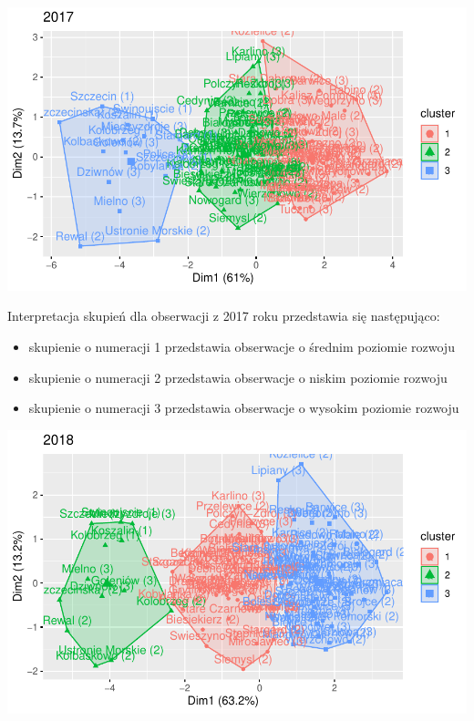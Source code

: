 \documentclass{amuthesis}
\begin{document}
\begin{center}\includegraphics[width=1.05\linewidth]{figures/unnamed-chunk-12-1} \end{center}

Interpretacja skupień dla obserwacji z 2017 roku przedstawia się następująco:

\begin{itemize}
\tightlist
\item
  skupienie o numeracji 1 przedstawia obserwacje o średnim poziomie rozwoju
\item
  skupienie o numeracji 2 przedstawia obserwacje o niskim poziomie rozwoju
\item
  skupienie o numeracji 3 przedstawia obserwacje o wysokim poziomie rozwoju
\end{itemize}

\begin{Shaded}
\begin{Highlighting}[]
\OtherTok{\textless{}{-}} \SpecialCharTok{$} \NormalTok{, } \NormalTok{)}
\SpecialCharTok{::}\SpecialCharTok{+}\SpecialCharTok{::}\NormalTok{(}\NormalTok{)}
\end{Highlighting}
\end{Shaded}

\begin{center}\includegraphics[width=1.05\linewidth]{figures/unnamed-chunk-13-1} \end{center}
\end{document}
